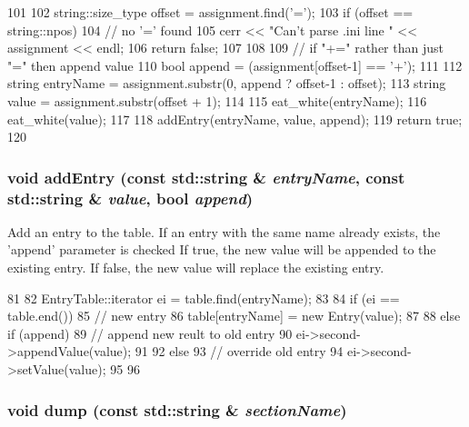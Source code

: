 \begin{DoxyCode}
101 {
102     string::size_type offset = assignment.find('=');
103     if (offset == string::npos) {
104         // no '=' found
105         cerr << "Can't parse .ini line " << assignment << endl;
106         return false;
107     }
108 
109     // if "+=" rather than just "=" then append value
110     bool append = (assignment[offset-1] == '+');
111 
112     string entryName = assignment.substr(0, append ? offset-1 : offset);
113     string value = assignment.substr(offset + 1);
114 
115     eat_white(entryName);
116     eat_white(value);
117 
118     addEntry(entryName, value, append);
119     return true;
120 }
\end{DoxyCode}
\hypertarget{classIniFile_1_1Section_a413d316c230aa09f6a7ec81c0f6a0a3c}{
\subsubsection[{addEntry}]{\setlength{\rightskip}{0pt plus 5cm}void addEntry (const std::string \& {\em entryName}, \/  const std::string \& {\em value}, \/  bool {\em append})}}
\label{classIniFile_1_1Section_a413d316c230aa09f6a7ec81c0f6a0a3c}
Add an entry to the table. If an entry with the same name already exists, the 'append' parameter is checked If true, the new value will be appended to the existing entry. If false, the new value will replace the existing entry. 


\begin{DoxyCode}
81 {
82     EntryTable::iterator ei = table.find(entryName);
83 
84     if (ei == table.end()) {
85         // new entry
86         table[entryName] = new Entry(value);
87     }
88     else if (append) {
89         // append new reult to old entry
90         ei->second->appendValue(value);
91     }
92     else {
93         // override old entry
94         ei->second->setValue(value);
95     }
96 }
\end{DoxyCode}
\hypertarget{classIniFile_1_1Section_a249475ee201869af7bf1723fed47acd2}{
\subsubsection[{dump}]{\setlength{\rightskip}{0pt plus 5cm}void dump (const std::string \& {\em sectionName})}}
\label{classIniFile_1_1Section_a249475ee201869af7bf1723fed47acd2}


